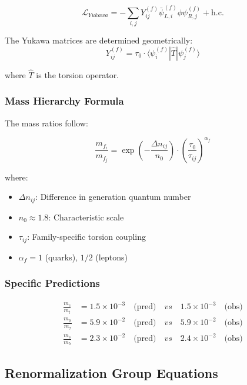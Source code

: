\begin{equation}
    \mathcal{L}_{Yukawa} = -\sum_{i,j} Y_{ij}^{(f)} \bar{\psi}_{L,i}^{(f)} \phi \psi_{R,j}^{(f)} + \text{h.c.}
\end{equation}

The Yukawa matrices are determined geometrically:
\begin{equation}
    Y_{ij}^{(f)} = \tau_0 \cdot \langle\psi_i^{(f)}|\hat{T}|\psi_j^{(f)}\rangle
\end{equation}

where $\hat{T}$ is the torsion operator.

\subsubsection{Mass Hierarchy Formula}

The mass ratios follow:

\begin{equation}
    \frac{m_{f_i}}{m_{f_j}} = \exp\left(-\frac{\Delta n_{ij}}{n_0}\right) \cdot \left(\frac{\tau_0}{\tau_{ij}}\right)^{\alpha_f}
\end{equation}

where:
\begin{itemize}
    \item $\Delta n_{ij}$: Difference in generation quantum number
    \item $n_0 \approx 1.8$: Characteristic scale
    \item $\tau_{ij}$: Family-specific torsion coupling
    \item $\alpha_f = 1$ (quarks), $1/2$ (leptons)
\end{itemize}

\subsubsection{Specific Predictions}

\begin{align}
    \frac{m_c}{m_t} &= 1.5 \times 10^{-3} \quad \text{(pred)} \quad vs \quad 1.5 \times 10^{-3} \quad \text{(obs)} \\
    \frac{m_\mu}{m_\tau} &= 5.9 \times 10^{-2} \quad \text{(pred)} \quad vs \quad 5.9 \times 10^{-2} \quad \text{(obs)} \\
    \frac{m_s}{m_b} &= 2.3 \times 10^{-2} \quad \text{(pred)} \quad vs \quad 2.4 \times 10^{-2} \quad \text{(obs)}
\end{align}

\subsection{Renormalization Group Equations}

